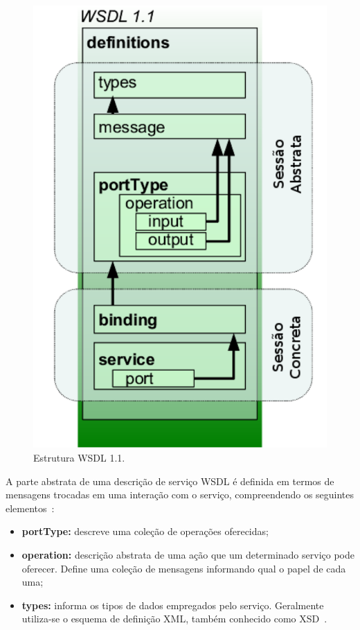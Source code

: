 \documentclass[12pt]{report} %
\begin{document}
		\begin{figure}[!htb]
		\begin{center}
		    \includegraphics[scale=0.50]{imagens/wsdl-est.pdf} 
		    \caption{Estrutura WSDL 1.1.}
		    \label{fig:WSDL-est}
		\end{center}
		\end{figure}

		A parte abstrata de uma descrição de serviço WSDL é definida em termos de mensagens trocadas em uma interação com o serviço, compreendendo os seguintes elementos~\cite{marioLivro}:
		
		\begin{itemize}
		    \item \textbf{portType:} descreve uma coleção de operações oferecidas;
		    \item \textbf{operation:} descrição abstrata de uma ação que um determinado serviço pode oferecer. Define uma coleção de mensagens informando qual o papel de cada uma;
		    \item \textbf{types:} informa os tipos de dados empregados pelo serviço.
			    Geralmente utiliza-se o esquema de definição XML, também conhecido como XSD~\cite{xsd:website}.
		\end{itemize}
\end{document}
